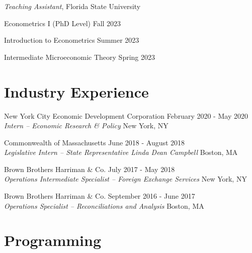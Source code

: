 \documentclass[letterpaper]{article}
\renewenvironment{itemize}{
  \begin{list}{}{
    \setlength{\leftmargin}{1.5em}
  }
}{
  \end{list}
}
\begin{document}
\begin{itemize}

    \item \textit{Teaching Assistant}, Florida State University
    
    \hspace{10pt} Econometrics I (PhD Level) \hfill Fall 2023
    
    \hspace{10pt} Introduction to Econometrics  \hfill Summer 2023
    
    \hspace{10pt} Intermediate Microeconomic Theory  \hfill Spring 2023
    
\end{itemize}

\section*{Industry Experience}

\begin{itemize}

    \item New York City Economic Development Corporation \hfill February 2020 - May 2020 \\
    {\sl Intern -- Economic Research \& Policy} \hfill New York, NY

    \item Commonwealth of Massachusetts \hfill June 2018 - August 2018 \\
    {\sl Legislative Intern -- State Representative Linda Dean Campbell} \hfill Boston, MA

    \item Brown Brothers Harriman \& Co. \hfill July 2017 - May 2018 \\
    {\sl Operations Intermediate Specialist – Foreign Exchange Services} \hfill New York, NY

    \item Brown Brothers Harriman \& Co. \hfill September 2016 - June 2017 \\
    {\sl Operations Specialist – Reconciliations and Analysis} \hfill Boston, MA
\end{itemize}




\section*{Programming}
\end{document}
